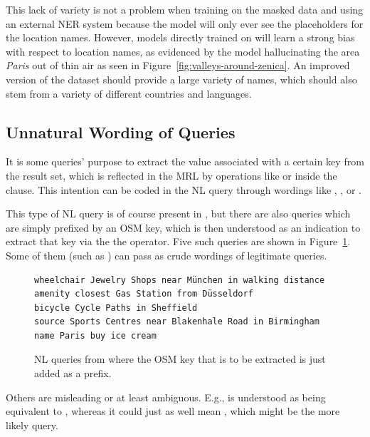 This lack of variety is not a problem when training on the masked data and using
an external NER system because the model will only ever see the placeholders for
the location names. However, models directly trained on \nlmapstwo{} will learn
a strong bias with respect to location names, as evidenced by the model
hallucinating the area \emph{Paris} out of thin air as seen in
Figure~\ref{fig:valleys-around-zenica}. An improved version of the dataset
should provide a large variety of names, which should also stem from a variety
of different countries and languages.

\subsection{Unnatural Wording of Queries}
\label{sec:unnatural-wording}

It is some queries’ purpose to extract the value associated with a certain key
from the result set, which is reflected in the MRL by operations like
 or  inside the 
clause. This intention can be coded in the NL query through wordings like
, ,  or .

This type of NL query is of course present in \nlmapstwo{}, but there are also
queries which are simply prefixed by an OSM key, which is then understood as an
indication to extract that key via the the  operator. Five such
queries are shown in Figure~\ref{fig:nlmaps-v2-unnatural-wording}. Some of them
(such as ) can pass as crude wordings of legitimate
queries.

\begin{figure}[h]
  \centering
  \begin{lstlisting}[style=MyNL]
wheelchair Jewelry Shops near München in walking distance
amenity closest Gas Station from Düsseldorf
bicycle Cycle Paths in Sheffield
source Sports Centres near Blakenhale Road in Birmingham
name Paris buy ice cream
  \end{lstlisting}
  \caption[Unnatural \nlmapstwo{} queries]{NL queries from \nlmapstwo{} where
    the OSM key that is to be extracted is just added as a prefix.}
  \label{fig:nlmaps-v2-unnatural-wording}
\end{figure}

Others are misleading or at least ambiguous. E.g.,  is understood as being equivalent to
,
whereas it could just as well mean , which might be the more likely query.

